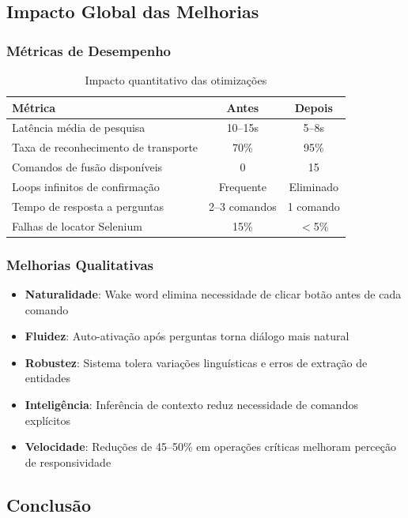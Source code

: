\documentclass{report}
\begin{document}
\subsection{Impacto Global das Melhorias}

\subsubsection{Métricas de Desempenho}

\begin{table}[h]
\centering
\caption{Impacto quantitativo das otimizações}
\label{tab:global-impact}
\begin{tabular}{lcc}
\toprule
\textbf{Métrica} & \textbf{Antes} & \textbf{Depois} \\
\midrule
Latência média de pesquisa & 10--15s & 5--8s \\
Taxa de reconhecimento de transporte & 70\% & 95\% \\
Comandos de fusão disponíveis & 0 & 15 \\
Loops infinitos de confirmação & Frequente & Eliminado \\
Tempo de resposta a perguntas & 2--3 comandos & 1 comando \\
Falhas de locator Selenium & 15\% & $<$5\% \\
\bottomrule
\end{tabular}
\end{table}

\subsubsection{Melhorias Qualitativas}

\begin{itemize}
    \item \textbf{Naturalidade}: Wake word elimina necessidade de clicar botão antes de cada comando
    \item \textbf{Fluidez}: Auto-ativação após perguntas torna diálogo mais natural
    \item \textbf{Robustez}: Sistema tolera variações linguísticas e erros de extração de entidades
    \item \textbf{Inteligência}: Inferência de contexto reduz necessidade de comandos explícitos
    \item \textbf{Velocidade}: Reduções de 45--50\% em operações críticas melhoram perceção de responsividade
\end{itemize}

\subsection{Conclusão}
\end{document}
